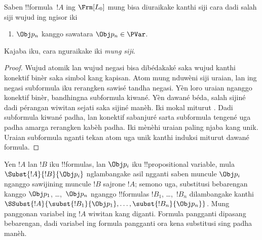 \documentclass[../../../include/open-logic-section]{subfiles}
\begin{document}
\begin{prop}
Saben !!{formula}~$!A$ ing $ \Frm[L_0]$ mung bisa diuraikake kanthi
siji cara dadi salah siji wujud ing ngisor iki
\begin{enumerate}


\item $\Obj p_n$ kanggo sawatara $\Obj p_n \in  \PVar$.
  




\end{enumerate}
Kajaba iku, cara nguraikake iki \emph{mung siji}.
\end{prop}

\begin{proof}
Wujud atomik lan wujud negasi bisa dibédakaké saka wujud kanthi
konektif binèr saka simbol kang kapisan. Atom mung nduwèni siji uraian,
lan ing negasi subformula iku rerangken sawisé tandha negasi.
Yèn loro uraian nganggo konektif binèr, bandhingna subformula kiwané.
Yèn dawané béda, salah sijiné dadi pérangan wiwitan sejati saka
sijiné manèh. Iki mokal miturut . Dadi subformula
kiwané padha, lan konektif sabanjuré sarta subformula tengené uga
padha amarga rerangken kabèh padha. Iki mènèhi uraian paling njaba
kang unik. Uraian subformula nganti tekan atom uga unik kanthi induksi
miturut dawané formula.
\end{proof}


\begin{defn}
Yen $!A$ lan $!B$ iku !!{formula}s, lan $\Obj p_i$ iku !!{propositional
variable}, mula $\Subst{!A}{!B}{\Obj p_i}$ nglambangake asil ngganti
saben muncule $\Obj p_i$ nganggo sawijining muncule $!B$ sajrone $!A$;
semono uga, substitusi bebarengan kanggo $\Obj p_1$, \dots,~$\Obj p_n$ nganggo
!!{formula}s $!B_1$, \dots,~$!B_n$ dilambangake kanthi
$\SSubst{!A}{\subst{!B_1}{\Obj p_1},\dots,\subst{!B_n}{\Obj p_n}}$.
Mung panggonan variabel ing $!A$ wiwitan kang diganti.
Formula pangganti dipasang bebarengan, dadi variabel ing formula
pangganti ora kena substitusi sing padha manèh.
\end{defn}
\end{document}
